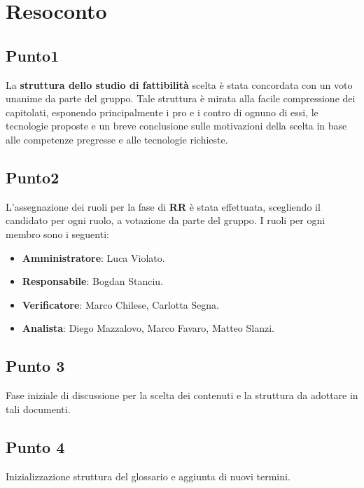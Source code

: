 \section{Resoconto}

\subsection{Punto1}

La \textbf{struttura dello studio di fattibilità} scelta è stata concordata con un voto unanime da parte del gruppo. Tale struttura è mirata alla facile compressione dei capitolati, esponendo principalmente i pro e i contro di ognuno di essi, le tecnologie proposte e un breve conclusione sulle motivazioni della scelta in base alle competenze pregresse e alle tecnologie richieste.  


\subsection{Punto2}
L'assegnazione dei ruoli per la fase di \textbf{RR} è stata effettuata, scegliendo il candidato per ogni ruolo, a votazione da parte del gruppo. I ruoli per ogni membro sono i seguenti: 
\begin{itemize}
	\item \textbf{Amministratore}: Luca Violato.
	\item \textbf{Responsabile}: Bogdan Stanciu.
	\item \textbf{Verificatore}: Marco Chilese, Carlotta Segna. 
	\item \textbf{Analista}: Diego Mazzalovo, Marco Favaro, Matteo Slanzi. 
\end{itemize}


\subsection{Punto 3}
Fase iniziale di discussione per la scelta dei contenuti e la struttura da adottare in tali documenti. 

\subsection{Punto 4}
Inizializzazione struttura del glossario e aggiunta di nuovi termini. 

